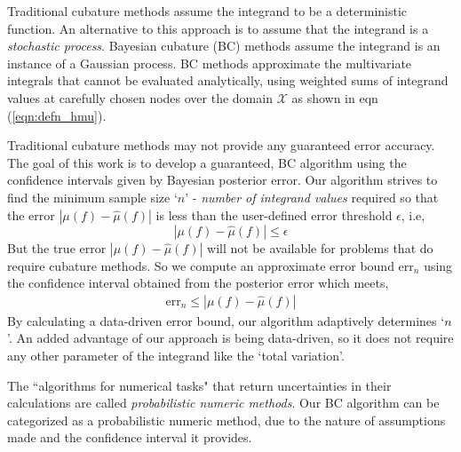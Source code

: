 \documentclass[smallextended]{svjour3}       %
\DeclareMathOperator{\Order}{{\mathcal O}}
\newcommand{\hmu}{\hat{\mu}}
\newcommand{\errtol}{\epsilon}
\newcommand{\errn}{\text{err}_{n}}
\def\abs#1{\ensuremath{\left \lvert #1 \right \rvert}}
\begin{document}
Traditional cubature methods assume the integrand to be a deterministic function.
An alternative to this approach is to assume that the integrand is a \emph{stochastic process}.
Bayesian cubature (BC) methods assume the integrand is an instance of a Gaussian process. 
BC methods approximate the multivariate integrals that cannot be evaluated analytically, using weighted sums of integrand values at carefully chosen nodes over the domain $\mathcal{X}$ as shown in eqn  (\ref{eqn:defn_hmu}).





Traditional cubature methods may not provide any guaranteed error accuracy. 
The goal of this work is to develop a guaranteed, BC algorithm using the confidence intervals given by Bayesian posterior error. 
Our algorithm strives to find the minimum sample size `$n$' - \textit{number of integrand values} required so that the error $\abs{\mu(f) - \hmu(f)}$ is less than the user-defined error threshold $\errtol$, i.e, 
\[
\abs{\mu(f) - \hmu(f)} \leq \errtol 
\] 
But the true error $\abs{\mu(f) - \hmu(f)}$ will not be available for problems that do require cubature methods.
So we compute an approximate error bound $\errn$ using the confidence interval obtained from the posterior error which meets,
\begin{align*}
\errn \leq \abs{\mu(f) - \hmu(f)}
\end{align*}
By calculating a data-driven error bound, our algorithm adaptively determines `$n$'.
An added advantage of our approach is being data-driven, so it does not require any other parameter of the integrand like the `total variation'.


The ``algorithms for numerical tasks" that return uncertainties in their calculations are called \emph{probabilistic numeric methods}. %
Our BC algorithm can be categorized as a probabilistic numeric method, due to the nature of assumptions made and the confidence interval it provides.
\end{document}

